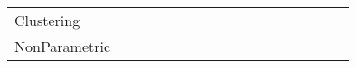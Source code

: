 \begin{tabular}{lllllllllllllllll}
Clustering               &             &                         &                         &                    &                   &                 &                     &                   &                    &                           &                     &                  &                       &               &                      &                    \\
NonParametric            &             &                         &                         &                    &                   &                 &                     &                   &                    &                           &                     &                  &                       &               &                      &                    \\
\bottomrule
\end{tabular}
